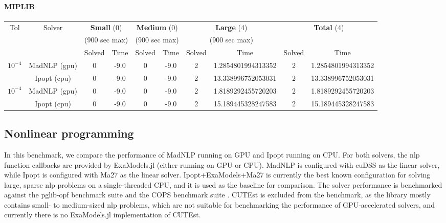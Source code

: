 \documentclass{article}
\begin{document}
\paragraph{MIPLIB}
\begin{center}
  \begin{tabular}{|c|c|cc|cc|cc|cc|}
    \hline
    \multirow{ 3}{*}{Tol} & \multirow{ 3}{*}{Solver} & \multicolumn{2}{c|}{\textbf{Small} (0)}& \multicolumn{2}{c|}{\textbf{Medium} (0)}& \multicolumn{2}{c|}{\textbf{Large} (4)}& \multicolumn{2}{c|}{\multirow{2}{*}{\textbf{Total} (4)}}\\
                          && \multicolumn{2}{c|}{(900 sec max)}& \multicolumn{2}{c|}{(900 sec max)}& \multicolumn{2}{c|}{(900 sec max)}&&\\
                          &&  Solved & Time &  Solved & Time &  Solved & Time &  Solved & Time \\
    \hline
    \multirow{2}{*}{$10^{-4}$} & MadNLP (gpu) & 0 & -9.0 & 0 & -9.0 & 2 & 1.2854801994313352 & 2 & 1.2854801994313352  \\
                          & Ipopt (cpu) & 0 & -9.0 & 0 & -9.0 & 2 & 13.338996752053031 & 2 & 13.338996752053031  \\

    \hline
    \multirow{2}{*}{$10^{-4}$} & MadNLP (gpu) & 0 & -9.0 & 0 & -9.0 & 2 & 1.8189292455720203 & 2 & 1.8189292455720203  \\
                          & Ipopt (cpu) & 0 & -9.0 & 0 & -9.0 & 2 & 15.189445328247583 & 2 & 15.189445328247583  \\

    \hline
  \end{tabular}
\end{center}

\subsection{Nonlinear programming}
In this benchmark, we compare the performance of MadNLP running on GPU and Ipopt running on CPU. For both solvers, the \gls*{nlp} function callbacks are provided by ExaModels.jl (either running on GPU or CPU). MadNLP is configured with cuDSS as the linear solver, while Ipopt is configured with Ma27 as the linear solver. Ipopt+ExaModels+Ma27 is currently the best known configuration for solving large, sparse \gls*{nlp} problems on a single-threaded CPU, and it is used as the baseline for comparison. The solver performance is benchmarked against the pglib-opf benchmark suite \cite{} and the COPS benchmark suite \cite{}. CUTEst \cite{} is excluded from the benchmark, as the library mostly contains small- to medium-sized \gls*{nlp} problems, which are not suitable for benchmarking the performance of GPU-accelerated solvers, and currently there is no ExaModels.jl implementation of CUTEst.
\end{document}
